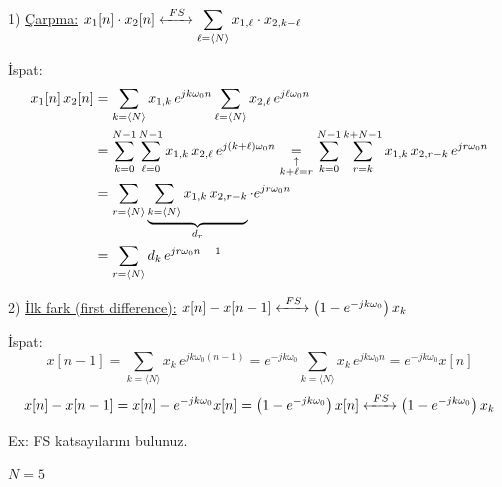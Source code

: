 \documentclass[11pt,a4paper]{article}
\begin{document}
1) \underline{Çarpma:} \quad $x_1[n]\cdot x_2[n] \xleftrightarrow{\ FS\ } \displaystyle\sum_{\ell=\langle N\rangle} x_{1,\ell}\cdot x_{2,k-\ell}$

İspat:
\begin{align*}
x_1[n]\,x_2[n] &= \sum_{k=\langle N\rangle} x_{1,k}\,e^{jk\omega_0 n}\sum_{\ell=\langle N\rangle} x_{2,\ell}\,e^{j\ell\omega_0 n}\\
&= \sum_{k=0}^{N-1}\sum_{\ell=0}^{N-1} x_{1,k}\,x_{2,\ell}\,e^{j(k+\ell)\omega_0 n}
   \underset{\substack{\uparrow\\ k+\ell=r}}{=} \sum_{k=0}^{N-1}\sum_{r=k}^{k+N-1} x_{1,k}\,x_{2,r-k}\,e^{jr\omega_0 n}\\
&= \sum_{r=\langle N\rangle}\underbrace{\sum_{k=\langle N\rangle} x_{1,k}\,x_{2,r-k}}_{d_r}\cdot e^{jr\omega_0 n}\\
&= \sum_{r=\langle N\rangle} d_k\,e^{jr\omega_0 n}\quad\text{\footnotemark}
\end{align*}

2) \underline{İlk fark (first difference):} \quad $x[n]-x[n-1] \xleftrightarrow{\ FS\ } \left(1-e^{-jk\omega_0}\right)x_k$

İspat:
\[ x[n-1]=\sum_{k=\langle N\rangle} x_k\,e^{jk\omega_0(n-1)}=e^{-jk\omega_0}\sum_{k=\langle N\rangle} x_k\,e^{jk\omega_0 n}=e^{-jk\omega_0}x[n] \]
\[ x[n]-x[n-1]=x[n]-e^{-jk\omega_0}x[n]=\left(1-e^{-jk\omega_0}\right)x[n] \xleftrightarrow{\ FS\ } \left(1-e^{-jk\omega_0}\right)x_k \]

\begin{ornek}
Ex: \hfill FS katsayılarını bulunuz.
\begin{center}
\end{center}
\end{ornek}
$N=5$
\end{document}
